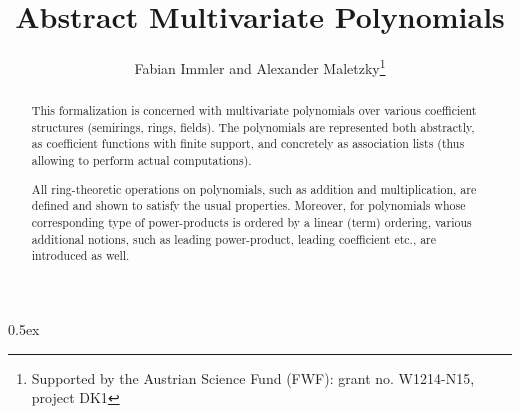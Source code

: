 \documentclass[11pt,a4paper]{article}
\begin{document}
\title{Abstract Multivariate Polynomials}
\author{Fabian Immler and Alexander Maletzky\thanks{Supported by the Austrian 
Science Fund (FWF): grant no. W1214-N15, project DK1}}
\maketitle

\begin{abstract}
This formalization is concerned with multivariate polynomials over various 
coefficient structures (semirings, rings, fields). The polynomials are 
represented both abstractly, as coefficient functions with finite support, and 
concretely as association lists (thus allowing to perform actual computations).

All ring-theoretic operations on polynomials, such as addition and 
multiplication, are defined and shown to satisfy the usual properties. Moreover, 
for polynomials whose corresponding type of power-products is ordered by a 
linear (term) ordering, various additional notions, such as leading 
power-product, leading coefficient etc., are introduced as well.
\end{abstract}

\tableofcontents

\parindent 0pt\parskip 0.5ex





\end{document}
